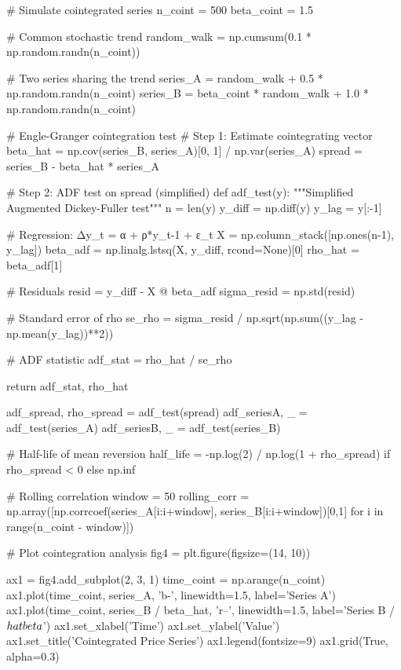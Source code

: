 \documentclass[a4paper, 11pt]{article}
\begin{document}
\begin{pycode}
# Simulate cointegrated series
n_coint = 500
beta_coint = 1.5

# Common stochastic trend
random_walk = np.cumsum(0.1 * np.random.randn(n_coint))

# Two series sharing the trend
series_A = random_walk + 0.5 * np.random.randn(n_coint)
series_B = beta_coint * random_walk + 1.0 * np.random.randn(n_coint)

# Engle-Granger cointegration test
# Step 1: Estimate cointegrating vector
beta_hat = np.cov(series_B, series_A)[0, 1] / np.var(series_A)
spread = series_B - beta_hat * series_A

# Step 2: ADF test on spread (simplified)
def adf_test(y):
    """Simplified Augmented Dickey-Fuller test"""
    n = len(y)
    y_diff = np.diff(y)
    y_lag = y[:-1]

    # Regression: Δy_t = α + ρ*y_{t-1} + ε_t
    X = np.column_stack([np.ones(n-1), y_lag])
    beta_adf = np.linalg.lstsq(X, y_diff, rcond=None)[0]
    rho_hat = beta_adf[1]

    # Residuals
    resid = y_diff - X @ beta_adf
    sigma_resid = np.std(resid)

    # Standard error of rho
    se_rho = sigma_resid / np.sqrt(np.sum((y_lag - np.mean(y_lag))**2))

    # ADF statistic
    adf_stat = rho_hat / se_rho

    return adf_stat, rho_hat

adf_spread, rho_spread = adf_test(spread)
adf_seriesA, _ = adf_test(series_A)
adf_seriesB, _ = adf_test(series_B)

# Half-life of mean reversion
half_life = -np.log(2) / np.log(1 + rho_spread) if rho_spread < 0 else np.inf

# Rolling correlation
window = 50
rolling_corr = np.array([np.corrcoef(series_A[i:i+window],
                                     series_B[i:i+window])[0,1]
                        for i in range(n_coint - window)])

# Plot cointegration analysis
fig4 = plt.figure(figsize=(14, 10))

ax1 = fig4.add_subplot(2, 3, 1)
time_coint = np.arange(n_coint)
ax1.plot(time_coint, series_A, 'b-', linewidth=1.5, label='Series A')
ax1.plot(time_coint, series_B / beta_hat, 'r--', linewidth=1.5,
         label='Series B / $\\hat{\\beta}$')
ax1.set_xlabel('Time')
ax1.set_ylabel('Value')
ax1.set_title('Cointegrated Price Series')
ax1.legend(fontsize=9)
ax1.grid(True, alpha=0.3)


\end{pycode}
\end{document}
